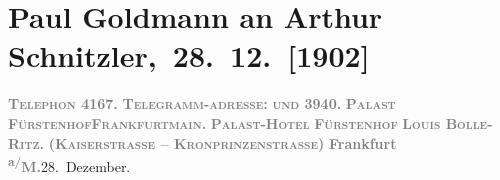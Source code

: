 

         
         \renewcommand{\erwaehntePersonen}{Personen:  ?? [Partner von Theodore Rottenberg, Ende 1902/Anfang 1903], Louis Bolle-Ritz, Theodore Rottenberg, Olga Schnitzler}
         \renewcommand{\erwaehnteInstitutionen}{Institutionen: Hotel Fürstenhof}
         \renewcommand{\erwaehnteOrte}{Orte: Frankfurt am Main, Fürstenhof, Kaiserstraße, Münchener Straße, Wien}
         \renewcommand{\erwaehnteWerke}{Werke: Neue Freie Presse}
               \section[ Paul Goldmann an Arthur Schnitzler, 28. 12. {[}1902{]}]{ Paul Goldmann an Arthur Schnitzler, 28. 12. {[}1902{]}}\nopagebreak{}\rehead{ }\begin{ledgroupsized}[t]{13cm}\normalsize\beginnumbering \toendnotes[C]{\smallbreak\pagebreak[2]} 
\toendnotes[C]{\smallbreak}\pstart
           \noindent{}{\pb}\textcolor{gray}{\textbf{\textsc{Telephon}{ }4167. }}\hfill \textcolor{gray}{\textbf{\textsc{Telegramm-adresse}:}}\pend
           \pstart
           \textcolor{gray}{\textbf{\textsc{und}{ }3940. }}\hfill \textcolor{gray}{\textbf{\textsc{Palast FürstenhofFrankfurtmain. }}}\pend
           \pstart
           \centering{}\textcolor{gray}{\textbf{\textsc{\textbf{Palast-Hotel}}}}\pend
           \pstart
           \noindent{}\centering{}\textcolor{gray}{\textbf{\textsc{Fürstenhof}}}\pend
           \pstart
           \noindent{}\centering{}\textcolor{gray}{\textbf{\textsc{Louis Bolle-Ritz.}}}\pend
           \pstart
           \noindent{}\centering{}\textcolor{gray}{\textbf{(\textsc{Kaiserstrasse – Kronprinzenstrasse})}}\pend
           \pstart
           \raggedleft{}\textcolor{gray}{\textbf{Frankfurt \textsuperscript{a/}M.}}28. Dezember.\pend

\end{ledgroupsized}
